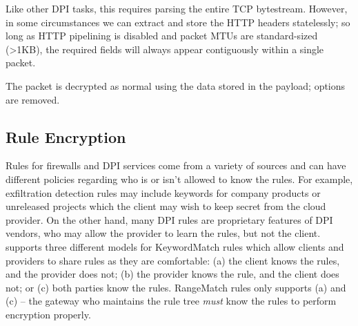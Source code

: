 Like other DPI tasks, this requires parsing the entire TCP bytestream.
However, in some circumstances we can extract and store the HTTP headers statelessly; so long as HTTP pipelining is disabled and packet MTUs are standard-sized (>1KB), the required fields will always appear contiguously within a single packet.

 The packet is decrypted as normal using the data stored in the payload; options are removed.



\subsection{Rule Encryption}
\label{sec:rulenc}

Rules for firewalls and DPI services come from a variety of sources and can have different policies regarding who is or isn't allowed to know the rules. 
For example, exfiltration detection rules may include keywords for company products or unreleased projects which the client may wish to keep secret from the cloud provider. 
On the other hand, many DPI rules are proprietary features of DPI vendors, who may allow the provider to learn the rules, but not the client.
\sys supports three different models for KeywordMatch rules which allow clients and providers to share rules as they are comfortable: (a) the client knows the rules, and the provider does not; (b) the provider knows the rule, and the client does not; or (c) both parties know the rules.
RangeMatch rules only supports (a) and (c) -- the gateway who maintains the rule tree {\it must} know the rules to perform encryption properly.

